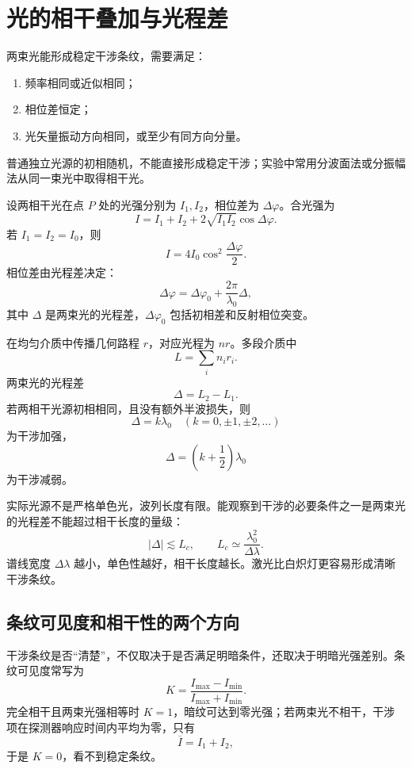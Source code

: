 \section{光的相干叠加与光程差}

\begin{definition}[相干光的条件]\label{def:coherent-light}
两束光能形成稳定干涉条纹，需要满足：
\begin{enumerate}
  \item 频率相同或近似相同；
  \item 相位差恒定；
  \item 光矢量振动方向相同，或至少有同方向分量。
\end{enumerate}
普通独立光源的初相随机，不能直接形成稳定干涉；实验中常用分波面法或分振幅法从同一束光中取得相干光。
\end{definition}

设两相干光在点 $P$ 处的光强分别为 $I_1,I_2$，相位差为 $\Delta\varphi$。合光强为
\[
  I=I_1+I_2+2\sqrt{I_1I_2}\cos\Delta\varphi.
\]
若 $I_1=I_2=I_0$，则
\[
  I=4I_0\cos^2\frac{\Delta\varphi}{2}.
\]
相位差由光程差决定：
\[
  \Delta\varphi=\Delta\varphi_0+\frac{2\pi}{\lambda_0}\Delta,
\]
其中 $\Delta$ 是两束光的光程差，$\Delta\varphi_0$ 包括初相差和反射相位突变。

\begin{definition}[光程和光程差]\label{def:optical-path}
在均匀介质中传播几何路程 $r$，对应光程为 $nr$。多段介质中
\[
  L=\sum_i n_i r_i.
\]
两束光的光程差
\[
  \Delta=L_2-L_1.
\]
若两相干光源初相相同，且没有额外半波损失，则
\[
  \Delta=k\lambda_0\quad(k=0,\pm1,\pm2,\ldots)
\]
为干涉加强，
\[
  \Delta=\left(k+\frac12\right)\lambda_0
\]
为干涉减弱。
\end{definition}

\begin{attention}[时间相干性与相干长度]
实际光源不是严格单色光，波列长度有限。能观察到干涉的必要条件之一是两束光的光程差不能超过相干长度的量级：
\[
  |\Delta|\lesssim L_c,\qquad L_c\simeq\frac{\lambda_0^2}{\Delta\lambda}.
\]
谱线宽度 $\Delta\lambda$ 越小，单色性越好，相干长度越长。激光比白炽灯更容易形成清晰干涉条纹。
\end{attention}

\subsection*{条纹可见度和相干性的两个方向}

干涉条纹是否“清楚”，不仅取决于是否满足明暗条件，还取决于明暗光强差别。条纹可见度常写为
\[
  K=\frac{I_{\max}-I_{\min}}{I_{\max}+I_{\min}}.
\]
完全相干且两束光强相等时 $K=1$，暗纹可达到零光强；若两束光不相干，干涉项在探测器响应时间内平均为零，只有
\[
  \overline I=I_1+I_2,
\]
于是 $K=0$，看不到稳定条纹。


